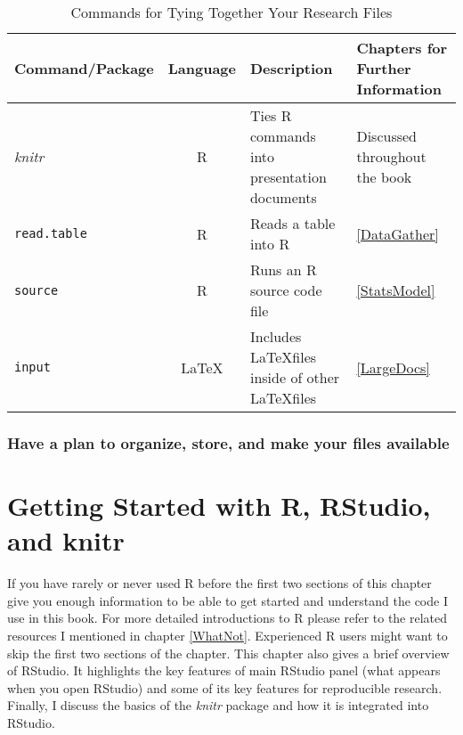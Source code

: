 \documentclass[ChapterTOCs,krantz1]{krantz}\usepackage{graphicx, color}
\begin{document}
\begin{landscape}
\begin{table}
    \caption{Commands for Tying Together Your Research Files}
    \label{TableTieCommands}
    \vspace{0.3cm}
    \begin{tabular}{l c  p{6cm}  p{4cm}}
        \hline
        Command/Package & Language & Description & Chapters for Further Information \\  
        \hline \hline
        {\emph{knitr}} & R & Ties R commands into presentation documents & Discussed throughout the book \\
        {\tt{read.table}} & R & Reads a table into R & \ref{DataGather} \\
        {\tt{source}} & R & Runs an R source code file & \ref{StatsModel} \\
        {\tt{input}} & \LaTeX & Includes \LaTeX files inside of other \LaTeX files & \ref{LargeDocs} \\
        
        \hline 
        
    \end{tabular}
\end{table}
\end{landscape}


\subsection{Have a plan to organize, store, and make your files available}





\chapter{Getting Started with R, RStudio, and knitr}\label{GettingStarted}

If you have rarely or never used R before the first two sections of this chapter give you enough information to be able to get started and understand the code I use in this book. For more detailed introductions to R please refer to the related resources I mentioned in chapter \ref{WhatNot}. Experienced R users might want to skip the first two sections of the chapter. This chapter also gives a brief overview of RStudio. It highlights the key features of main RStudio panel (what appears when you open RStudio) and some of its key features for reproducible research. Finally, I discuss the basics of the {\emph{knitr}} package and how it is integrated into RStudio.
\end{document}
